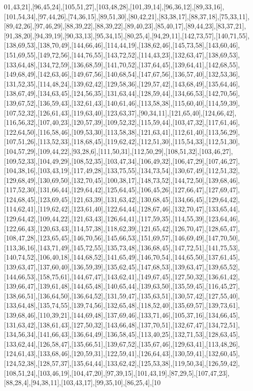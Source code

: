 01,43,21],[96,45,24],[105,51,27],[103,48,28],[101,39,14],[96,36,12],[89,33,16],[101,54,34],[97,44,26],[74,36,15],[89,51,30],[80,42,21],[83,38,17],[88,37,18],[75,33,11],[89,42,26],[97,46,29],[88,39,22],[88,39,22],[89,40,23],[85,40,17],[89,44,23],[83,37,21],[91,38,20],[94,39,19],[90,33,13],[95,34,15],[80,25,4],[94,29,11],[142,73,57],[140,71,55],[138,69,53],[138,70,49],[144,66,46],[114,44,19],[138,62,46],[145,73,58],[143,60,46],[151,69,55],[149,72,56],[144,76,55],[143,72,52],[114,43,23],[132,63,47],[138,69,53],[133,64,48],[134,72,59],[136,68,59],[141,70,52],[137,64,45],[139,64,41],[142,68,55],[149,68,49],[142,63,46],[149,67,56],[140,68,54],[147,67,56],[136,57,40],[132,53,36],[131,52,35],[114,48,24],[139,62,42],[129,58,36],[129,57,42],[143,68,49],[135,64,46],[138,67,49],[134,63,45],[124,56,35],[131,63,44],[128,59,44],[134,66,53],[142,70,56],[139,67,52],[136,59,43],[132,61,43],[140,61,46],[113,58,38],[115,60,40],[114,59,39],[107,52,32],[126,61,43],[119,63,40],[123,63,37],[90,34,11],[121,65,40],[124,66,42],[116,56,32],[107,40,23],[120,57,39],[109,52,32],[115,59,44],[103,47,32],[117,61,46],[122,64,50],[116,58,46],[109,53,30],[113,58,38],[121,63,41],[112,61,40],[113,56,29],[107,51,26],[113,52,33],[118,68,45],[119,62,42],[112,51,30],[115,54,33],[112,51,30],[104,57,29],[109,44,22],[93,28,6],[111,50,31],[112,50,29],[108,51,32],[103,46,27],[109,52,33],[104,49,29],[108,52,35],[103,47,34],[106,49,32],[106,47,29],[107,46,27],[104,38,16],[103,43,19],[117,49,28],[133,75,55],[134,73,54],[130,67,49],[112,51,32],[129,68,49],[130,69,50],[132,70,45],[100,38,17],[148,73,52],[144,72,50],[139,68,46],[117,52,30],[131,66,44],[129,64,42],[125,64,45],[106,45,26],[127,66,47],[127,69,47],[124,68,45],[123,69,45],[121,63,39],[131,63,42],[130,68,45],[134,66,45],[129,64,42],[114,62,41],[119,62,42],[123,61,40],[122,64,44],[128,67,46],[132,70,47],[133,65,44],[129,64,42],[109,44,22],[121,63,43],[126,64,41],[117,59,35],[114,55,39],[123,64,46],[122,66,43],[120,63,43],[114,57,38],[118,62,39],[121,65,42],[126,70,47],[128,65,47],[108,47,28],[123,65,45],[146,70,56],[145,66,53],[151,69,57],[146,69,49],[147,70,50],[113,36,16],[143,71,49],[145,72,55],[135,73,48],[136,68,45],[147,72,51],[141,75,53],[140,74,52],[106,40,18],[144,68,52],[141,65,49],[146,70,54],[144,65,50],[137,61,45],[139,63,47],[137,60,40],[136,59,39],[135,62,45],[147,68,53],[139,63,47],[139,65,52],[144,66,53],[158,75,61],[144,67,47],[143,62,41],[149,67,45],[127,50,32],[136,61,42],[139,66,47],[139,61,48],[144,65,48],[140,65,44],[139,63,50],[135,59,45],[116,45,27],[138,66,51],[136,64,50],[136,64,52],[131,59,47],[135,63,51],[130,57,42],[127,55,40],[133,64,48],[135,74,55],[139,74,56],[132,65,48],[118,52,40],[135,69,57],[139,73,61],[139,68,46],[110,39,21],[144,69,48],[137,69,46],[133,71,46],[105,37,16],[134,66,45],[131,63,42],[138,61,43],[127,50,32],[143,66,48],[137,70,51],[132,67,47],[134,72,51],[134,56,34],[141,66,43],[136,64,49],[136,58,45],[113,40,25],[132,71,53],[128,63,45],[133,62,44],[126,58,47],[135,66,51],[139,67,52],[135,67,46],[129,63,41],[113,48,26],[124,61,43],[133,68,46],[120,59,31],[122,59,41],[126,64,43],[130,59,41],[132,60,45],[124,52,38],[128,57,37],[135,64,44],[133,62,42],[125,53,38],[119,50,34],[126,59,42],[108,51,24],[103,46,19],[104,47,20],[97,39,15],[101,43,19],[87,29,5],[107,47,23],[88,28,4],[94,38,11],[103,43,17],[99,35,10],[86,25,4],[10
